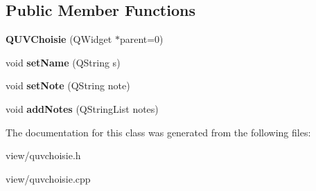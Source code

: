 \subsection*{Public Member Functions}
\begin{DoxyCompactItemize}
\item 
\hypertarget{classQUVChoisie_a248f74ec663eac3a1b40e188f248e365}{{\bfseries Q\+U\+V\+Choisie} (Q\+Widget $\ast$parent=0)}\label{classQUVChoisie_a248f74ec663eac3a1b40e188f248e365}

\item 
\hypertarget{classQUVChoisie_ae06021ab0da36bbd9318b26335e42593}{void {\bfseries set\+Name} (Q\+String s)}\label{classQUVChoisie_ae06021ab0da36bbd9318b26335e42593}

\item 
\hypertarget{classQUVChoisie_aa52a1e48864259c554ff01cb1e3ca6d6}{void {\bfseries set\+Note} (Q\+String note)}\label{classQUVChoisie_aa52a1e48864259c554ff01cb1e3ca6d6}

\item 
\hypertarget{classQUVChoisie_a6f3d77878a1a3f7d0064872fb328551c}{void {\bfseries add\+Notes} (Q\+String\+List notes)}\label{classQUVChoisie_a6f3d77878a1a3f7d0064872fb328551c}

\end{DoxyCompactItemize}


The documentation for this class was generated from the following files\+:\begin{DoxyCompactItemize}
\item 
view/quvchoisie.\+h\item 
view/quvchoisie.\+cpp\end{DoxyCompactItemize}
